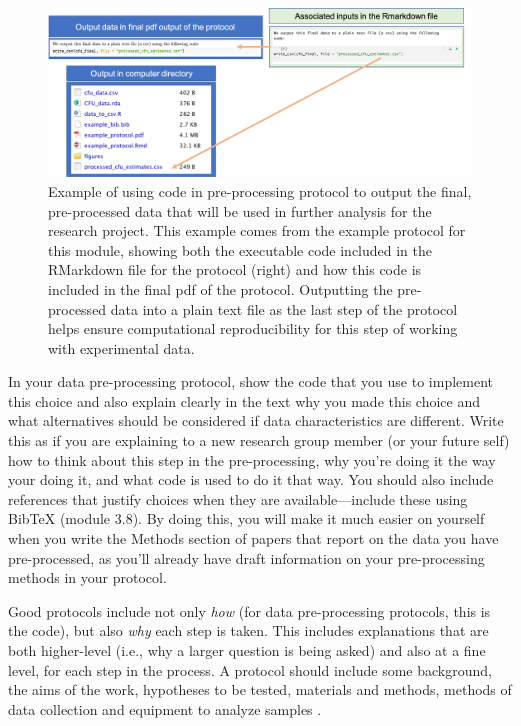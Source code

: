 \documentclass[]{tufte-book}
\begin{document}
\begin{figure}
\includegraphics[width=\textwidth]{figures/protocol_output_data} \caption[Example of using code in pre-processing protocol to output the final, pre-processed data that will be used in further analysis for the research project]{Example of using code in pre-processing protocol to output the final, pre-processed data that will be used in further analysis for the research project. This example comes from the example protocol for this module, showing both the executable code included in the RMarkdown file for the protocol (right) and how this code is included in the final pdf of the protocol. Outputting the pre-processed data into a plain text file as the last step of the protocol helps ensure computational reproducibility for this step of working with experimental data.}\label{fig:protocoloutput}
\end{figure}

In your data pre-processing protocol, show the code that you use to implement
this choice and also explain clearly in the text why you made this choice and
what alternatives should be considered if data characteristics are different.
Write this as if you are explaining to a new research group member (or your
future self) how to think about this step in the pre-processing, why you're
doing it the way your doing it, and what code is used to do it that way. You
should also include references that justify choices when they are
available---include these using BibTeX (module 3.8). By doing this, you will make it much
easier on yourself when you write the Methods section of papers that report on
the data you have pre-processed, as you'll already have draft information on
your pre-processing methods in your protocol.

Good protocols include not only \emph{how} (for data pre-processing protocols, this
is the code), but also \emph{why} each step is taken. This includes explanations that are both higher-level
(i.e., why a larger question is being asked) and also at a fine level, for each
step in the process. A protocol should include some background, the
aims of the work, hypotheses to be tested, materials and methods, methods of
data collection and equipment to analyze samples \citep{al2016protocol}.
\end{document}
